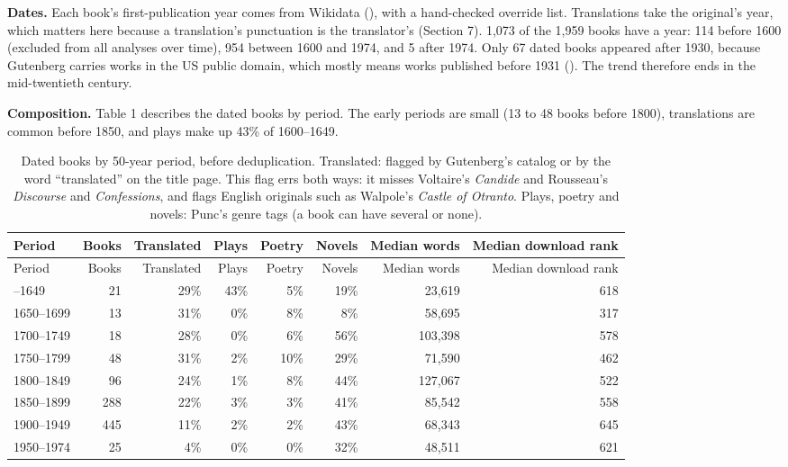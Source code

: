 \documentclass[
  11pt,
]{article}
\newcounter{none} %
\begin{document}
\textbf{Dates.} Each book's first-publication year comes from Wikidata (), with a hand-checked override list. Translations take the original's
year, which matters here because a translation's punctuation is the translator's (Section 7). 1,073 of the 1,959 books have a year: 114 before 1600 (excluded from all analyses over time), 954 between
1600 and 1974, and 5 after 1974. Only 67 dated books appeared after 1930, because Gutenberg carries works in the US public domain, which mostly means works published before 1931
(). The trend therefore ends in the mid-twentieth century.

\textbf{Composition.} Table 1 describes the dated books by period. The early periods are small (13 to 48 books before 1800), translations are common before 1850, and plays make up 43\% of 1600--1649.


\begin{longtable}[]{@{}lrrrrrrr@{}}
\caption{Dated books by 50-year period, before deduplication. Translated: flagged by Gutenberg's catalog or by the word ``translated'' on the title page. This flag errs both ways: it misses Voltaire's
\emph{Candide} and Rousseau's \emph{Discourse} and \emph{Confessions}, and flags English originals such as Walpole's \emph{Castle of Otranto}. Plays, poetry and novels: Punc's genre tags (a book can
have several or none).}\tabularnewline
\toprule\noalign{}
Period & Books & Translated & Plays & Poetry & Novels & Median words & Median download rank \\
\midrule\noalign{}
\endfirsthead
\toprule\noalign{}
Period & Books & Translated & Plays & Poetry & Novels & Median words & Median download rank \\
\midrule\noalign{}
\endhead
\bottomrule\noalign{}
\endlastfoot
1600--1649 & 21 & 29\% & 43\% & 5\% & 19\% & 23,619 & 618 \\
1650--1699 & 13 & 31\% & 0\% & 8\% & 8\% & 58,695 & 317 \\
1700--1749 & 18 & 28\% & 0\% & 6\% & 56\% & 103,398 & 578 \\
1750--1799 & 48 & 31\% & 2\% & 10\% & 29\% & 71,590 & 462 \\
1800--1849 & 96 & 24\% & 1\% & 8\% & 44\% & 127,067 & 522 \\
1850--1899 & 288 & 22\% & 3\% & 3\% & 41\% & 85,542 & 558 \\
1900--1949 & 445 & 11\% & 2\% & 2\% & 43\% & 68,343 & 645 \\
1950--1974 & 25 & 4\% & 0\% & 0\% & 32\% & 48,511 & 621 \\
\end{longtable}
\end{document}
